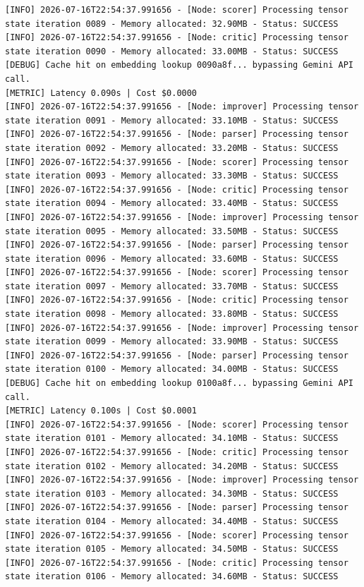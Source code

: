 \documentclass[10pt,journal,compsoc]{IEEEtran}
\begin{document}
\begin{verbatim}
[INFO] 2026-07-16T22:54:37.991656 - [Node: scorer] Processing tensor state iteration 0089 - Memory allocated: 32.90MB - Status: SUCCESS
[INFO] 2026-07-16T22:54:37.991656 - [Node: critic] Processing tensor state iteration 0090 - Memory allocated: 33.00MB - Status: SUCCESS
[DEBUG] Cache hit on embedding lookup 0090a8f... bypassing Gemini API call.
[METRIC] Latency 0.090s | Cost $0.0000
[INFO] 2026-07-16T22:54:37.991656 - [Node: improver] Processing tensor state iteration 0091 - Memory allocated: 33.10MB - Status: SUCCESS
[INFO] 2026-07-16T22:54:37.991656 - [Node: parser] Processing tensor state iteration 0092 - Memory allocated: 33.20MB - Status: SUCCESS
[INFO] 2026-07-16T22:54:37.991656 - [Node: scorer] Processing tensor state iteration 0093 - Memory allocated: 33.30MB - Status: SUCCESS
[INFO] 2026-07-16T22:54:37.991656 - [Node: critic] Processing tensor state iteration 0094 - Memory allocated: 33.40MB - Status: SUCCESS
[INFO] 2026-07-16T22:54:37.991656 - [Node: improver] Processing tensor state iteration 0095 - Memory allocated: 33.50MB - Status: SUCCESS
[INFO] 2026-07-16T22:54:37.991656 - [Node: parser] Processing tensor state iteration 0096 - Memory allocated: 33.60MB - Status: SUCCESS
[INFO] 2026-07-16T22:54:37.991656 - [Node: scorer] Processing tensor state iteration 0097 - Memory allocated: 33.70MB - Status: SUCCESS
[INFO] 2026-07-16T22:54:37.991656 - [Node: critic] Processing tensor state iteration 0098 - Memory allocated: 33.80MB - Status: SUCCESS
[INFO] 2026-07-16T22:54:37.991656 - [Node: improver] Processing tensor state iteration 0099 - Memory allocated: 33.90MB - Status: SUCCESS
[INFO] 2026-07-16T22:54:37.991656 - [Node: parser] Processing tensor state iteration 0100 - Memory allocated: 34.00MB - Status: SUCCESS
[DEBUG] Cache hit on embedding lookup 0100a8f... bypassing Gemini API call.
[METRIC] Latency 0.100s | Cost $0.0001
[INFO] 2026-07-16T22:54:37.991656 - [Node: scorer] Processing tensor state iteration 0101 - Memory allocated: 34.10MB - Status: SUCCESS
[INFO] 2026-07-16T22:54:37.991656 - [Node: critic] Processing tensor state iteration 0102 - Memory allocated: 34.20MB - Status: SUCCESS
[INFO] 2026-07-16T22:54:37.991656 - [Node: improver] Processing tensor state iteration 0103 - Memory allocated: 34.30MB - Status: SUCCESS
[INFO] 2026-07-16T22:54:37.991656 - [Node: parser] Processing tensor state iteration 0104 - Memory allocated: 34.40MB - Status: SUCCESS
[INFO] 2026-07-16T22:54:37.991656 - [Node: scorer] Processing tensor state iteration 0105 - Memory allocated: 34.50MB - Status: SUCCESS
[INFO] 2026-07-16T22:54:37.991656 - [Node: critic] Processing tensor state iteration 0106 - Memory allocated: 34.60MB - Status: SUCCESS

\end{verbatim}
\end{document}
